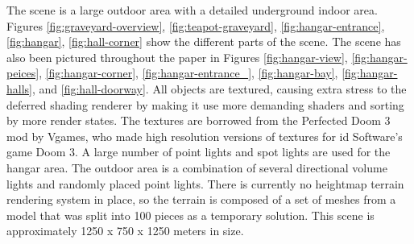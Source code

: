 \documentclass[12pt]{ucthesis}
\begin{document}
The scene is a large outdoor area with a detailed underground indoor area.
Figures \ref{fig:graveyard-overview}, \ref{fig:teapot-graveyard}, \ref{fig:hangar-entrance}, \ref{fig:hangar}, \ref{fig:hall-corner} show the different parts of the scene.
The scene has also been pictured throughout the paper in Figures \ref{fig:hangar-view}, \ref{fig:hangar-peices}, \ref{fig:hangar-corner}, \ref{fig:hangar-entrance_}, \ref{fig:hangar-bay}, \ref{fig:hangar-halls}, and \ref{fig:hall-doorway}.
All objects are textured, causing extra stress to the deferred shading renderer by making it use more demanding shaders and sorting by more render states.
The textures are borrowed from the Perfected Doom 3 mod by Vgames, who made high resolution versions of textures for id Software's game Doom 3.\cite{Perf-Doom3}
A large number of point lights and spot lights are used for the hangar area.
The outdoor area is a combination of several directional volume lights and randomly placed point lights.
There is currently no heightmap terrain rendering system in place, so the terrain is composed of a set of meshes from a model that was split into 100 pieces as a temporary solution.
This scene is approximately 1250 x 750 x 1250 meters in size.
\end{document}
